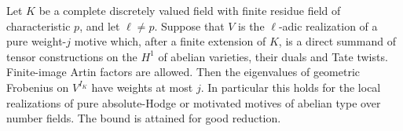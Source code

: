\begin{proposition}
\label{c:abelian-invariant-weights}
Let $K$ be a complete discretely valued field with finite residue field of
characteristic $p$, and let $\ell\ne p$.  Suppose that $V$ is the
$\ell$-adic realization of a pure weight-$j$ motive which, after a finite
extension of $K$, is a direct summand of tensor constructions on the
$H^1$ of abelian varieties, their duals and Tate twists.  Finite-image
Artin factors are allowed.  Then the eigenvalues of geometric Frobenius
on $V^{I_K}$ have weights at most $j$.  In particular this holds for the
local realizations of pure absolute-Hodge or motivated motives of abelian
type over number fields.  The bound is attained for good reduction.
\end{proposition}

